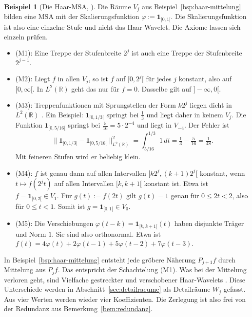 \documentclass[a4paper,11pt,bibliography=totoc,listof=totoc,headinclude=true,cleardoublepage=empty,oneside]{scrbook}
\theoremstyle{plain}
\theoremstyle{definition}
\newtheorem{Beispiel}[Satz]{Beispiel}
\newcommand{\R}{\mathbb{R}}
\newcommand{\LZwei}{L^2(\R)}
\newcommand{\norm}[1]{\lVert #1 \rVert}
\begin{document}
\begin{Beispiel}[Die Haar-MSA, {\cite[Kap.~5.1, Beispiel~1]{blatter}}] %
\label{bsp:haar-msa}
Die Räume $V_j$ aus Beispiel~\ref{bsp:haar-mittelung} bilden eine MSA mit der 
Skalierungsfunktion $\varphi := \mathbf 1_{[0,1[}$. Die Skalierungsfunktion ist
also eine einzelne Stufe und nicht das Haar-Wavelet. Die Axiome lassen sich
einzeln prüfen.
\begin{itemize}
\item (M1): Eine Treppe der Stufenbreite $2^{j}$ ist auch eine Treppe der
  Stufenbreite $2^{j-1}$.
\item (M2): Liegt $f$ in allen $V_j$, so ist $f$ auf $[0,2^j[$ für jedes $j$
  konstant, also auf $[0,\infty[$. In $\LZwei$ geht das nur für $f = 0$.
  Dasselbe gilt auf $]-\infty,0[$.
\item (M3): Treppenfunktionen mit Sprungstellen der Form $k2^j$ liegen dicht in
  $\LZwei$ \cite[Kap.~5.1]{blatter}. %
  Ein Beispiel: $\mathbf 1_{[0,1/3[}$ springt bei $\tfrac13$ und liegt daher in
  keinem $V_j$. Die Funktion $\mathbf 1_{[0,5/16[}$ springt bei
  $\tfrac5{16} = 5\cdot2^{-4}$ und liegt in $V_{-4}$. Der Fehler ist
  \[
    \norm{\mathbf 1_{[0,1/3[} - \mathbf 1_{[0,5/16[}}_{\LZwei}^2
    = \int_{5/16}^{1/3} 1\,dt = \tfrac13 - \tfrac5{16} = \tfrac1{48} .
  \]
  Mit feineren Stufen wird er beliebig klein.
\item (M4): $f$ ist genau dann auf allen Intervallen $[k2^j,(k+1)2^j[$
  konstant, wenn $t \mapsto f(2^j t)$ auf allen Intervallen $[k,k+1[$ konstant
  ist. Etwa ist $f = \mathbf 1_{[0,2[} \in V_1$. Für $g(t) := f(2t)$ gilt
  $g(t) = 1$ genau für $0 \le 2t < 2$, also für $0 \le t < 1$. Somit ist
  $g = \mathbf 1_{[0,1[} \in V_0$.
\item (M5): Die Verschiebungen $\varphi(t - k) = \mathbf 1_{[k,k+1[}(t)$ haben
  disjunkte Träger und Norm $1$. Sie sind also orthonormal. Etwa ist
  $f(t) = 4\varphi(t) + 2\varphi(t-1) + 5\varphi(t-2) + 7\varphi(t-3)$.
\end{itemize}
\end{Beispiel}

In Beispiel~\ref{bsp:haar-mittelung} entsteht jede gröbere Näherung
$P_{j+1} f$ durch Mittelung aus $P_j f$. Das entspricht der Schachtelung (M1).
Was bei der Mittelung verloren geht, sind Vielfache gestreckter und
verschobener Haar-Wavelets \cite[Kap.~2.2.1]{lmr}. %
Diese Unterschiede werden in Abschnitt~\ref{sec:detailraeume} als Detailräume
$W_j$ gefasst. Aus vier Werten werden wieder vier Koeffizienten. Die Zerlegung
ist also frei von der Redundanz aus Bemerkung~\ref{bem:redundanz}.
 
\end{document}
